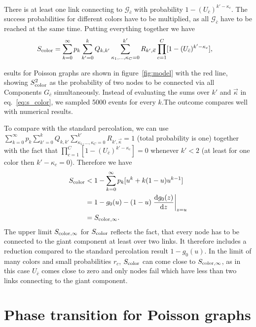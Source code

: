 \documentclass[aps, pre, onecolumn, a4paper, floatfix]{revtex4}
\begin{document}
There is at least one link connecting to ${\mathcal G}_{\bar c}$ with probability 
$1-(U_{\bar c})^{k'-\kappa_c}$. The success probabilities for different colors have to be 
multiplied, as all ${\mathcal G}_{\bar c}$ have to be reached at the same time. 
Putting everything together we have 
%
\begin{align}
S_{\rm color} &= \sum_{k=0}^{\infty}p_k \sum_{k'=0}^{k} Q_{k,k'} 
\sum_{\kappa_1,\dots, \kappa_C=0}^{k'} R_{k',\vec \kappa} 
\prod_{c=1}^C [1-(U_{\bar c})^{k'-\kappa_c}],\label{eq:s_color}
\end{align}

esults for Poisson graphs are shown in figure~\ref{fig:model} with the red line, showing 
$S_{\rm color}^2$ as the probability of two nodes to be connected via all Components 
$G_{\bar c}$ simultaneously. Instead of evaluating the sums over $k'$ and $\vec \kappa$ 
in eq.~\ref{eq:s_color}, we sampled 5000 events for every $k$.The outcome compares well with 
numerical results. 

To compare with the standard percolation, we can use $\sum_{k=0}^{\infty}p_k \sum_{k'=0}^{k} Q_{k,k'} 
\sum_{\kappa_1,\dots, \kappa_C=0}^{k'} R_{k',\vec \kappa} = 1$ (total probability is one) together with 
the fact that $\prod_{c=1}^C [1-(U_{\bar c})^{k'-\kappa_c}]=0$ whenever $k'<2$ (at least for one 
color then $k'-\kappa_c=0$). Therefore we have 
%
\begin{align}
S_{\rm color} &< 1-\sum_{k=0}^{\infty}p_k [u^k +k (1-u) u^{k-1}]\\
 &= 1 - g_0(u) - (1-u) \left.\frac{{\rm d}g_0(z)}{{\rm d}z}\right|_{z=u}\\
 &= S_{{\rm color},\infty}.
\end{align}
%
The upper limit $S_{{\rm color},\infty}$ for $S_{\rm color}$ reflects the fact, that every node has to be 
connected to the giant component at least over two links. It therefore includes a reduction 
compared to the standard percolation result $1-g_0(u)$. In the limit of many colors and small 
probabilities $r_c$, $S_{\rm color}$ can come close to $S_{{\rm color},\infty}$, as in this case $U_{\bar c}$ comes 
close to zero and only nodes fail which have less than two links connecting to the giant component.  


\section*{Phase transition for Poisson graphs}
\end{document}
